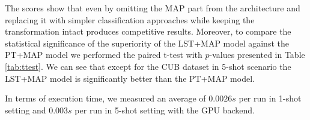\documentclass[letterpaper]{article} \usepackage{aaai20}  \usepackage{times}  \usepackage{helvet} \usepackage{courier}  \usepackage[hyphens]{url}  \usepackage{graphicx} \urlstyle{rm} \def\UrlFont{\rm}  \usepackage{graphicx}  \frenchspacing  \setlength{\pdfpagewidth}{8.5in}  \setlength{\pdfpageheight}{11in}  \usepackage[ruled,vlined]{algorithm2e}
\begin{document}
The scores show that even by omitting the MAP part from the architecture and replacing it with simpler classification approaches while keeping the transformation intact produces competitive results. Moreover, to compare the statistical significance of the superiority of the LST+MAP model against the PT+MAP model we performed the paired t-test with $p$-values presented in Table \ref{tab:ttest}. We can see that except for the CUB dataset in 5-shot scenario the LST+MAP model is significantly better than the PT+MAP model.

In terms of execution time, we measured an average of $0.0026s$ per run in 1-shot setting and $0.003s$ per run in 5-shot setting with the GPU backend.

\begin{table}[h!]
\caption{5-shot accuracy of models based on Power Transform (PT), our proposed Latent Space Transform (LST) and WideResNet backbone. The authors of the PT+MAP model presented accuracy $93.99\pm 0.10\%$ in 5-shot setting for CUB dataset, however we were able to obtain higher accuracy with their described model configuration.}
\vspace{5mm}
\label{tab:accuracies_5shot}
\centering
{}
\end{table}
\end{document}
